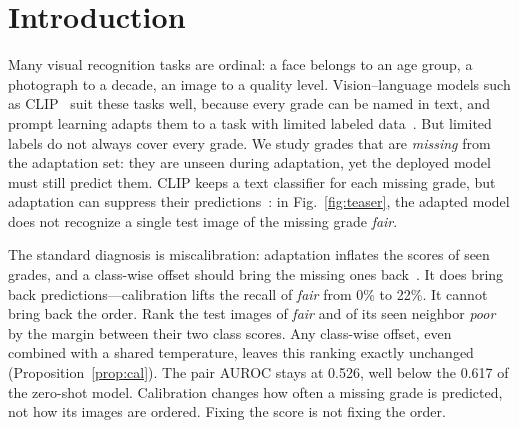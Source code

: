 \section{Introduction}
\label{sec:intro}


Many visual recognition tasks are ordinal: a face belongs to an age group, a photograph to a decade, an image to a quality level.
Vision--language models such as CLIP~\cite{radford2021clip} suit these tasks well, because every grade can be named in text, and prompt learning adapts them to a task with limited labeled data~\cite{zhou2022coop,zhou2022cocoop,li2022ordinalclip,wang2023l2rclip}.
But limited labels do not always cover every grade.
We study grades that are \emph{missing} from the adaptation set: they are unseen during adaptation, yet the deployed model must still predict them.
CLIP keeps a text classifier for each missing grade, but adaptation can suppress their predictions~\cite{mai2024fine}: in Fig.~\ref{fig:teaser}, the adapted model does not recognize a single test image of the missing grade \emph{fair}.

The standard diagnosis is miscalibration: adaptation inflates the scores of seen grades, and a class-wise offset should bring the missing ones back~\cite{chao2016gzsl,mai2024fine}.
It does bring back predictions---calibration lifts the recall of \emph{fair} from 0\% to 22\%.
It cannot bring back the order.
Rank the test images of \emph{fair} and of its seen neighbor \emph{poor} by the margin between their two class scores.
Any class-wise offset, even combined with a shared temperature, leaves this ranking exactly unchanged (Proposition~\ref{prop:cal}).
The pair AUROC stays at 0.526, well below the 0.617 of the zero-shot model.
Calibration changes how often a missing grade is predicted, not how its images are ordered.
Fixing the score is not fixing the order.


